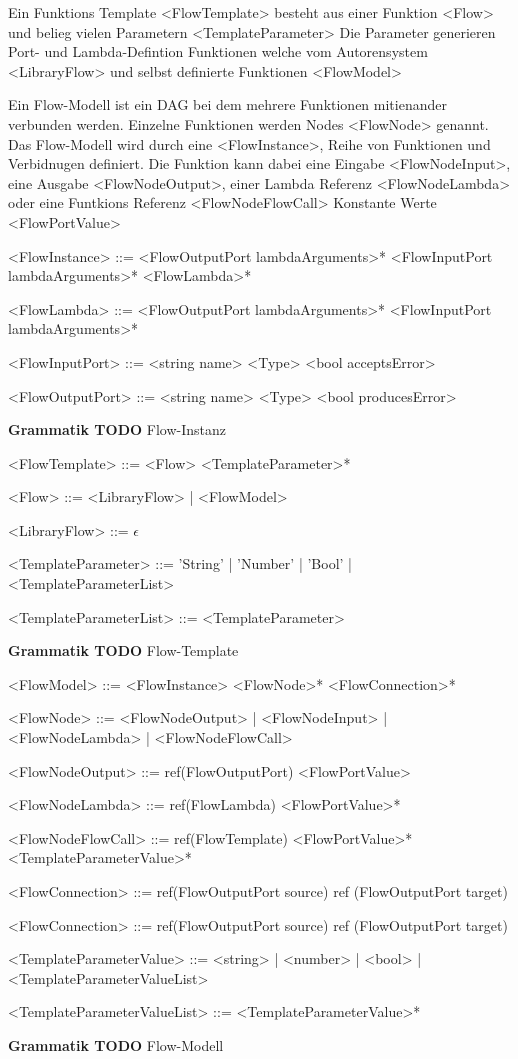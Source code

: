 \documentclass{article}
\begin{document}
    Ein Funktions Template <FlowTemplate> besteht aus einer Funktion <Flow> und belieg vielen Parametern <TemplateParameter>
    Die Parameter generieren Port- und Lambda-Defintion
    Funktionen welche vom Autorensystem <LibraryFlow> und selbst definierte Funktionen <FlowModel>

    Ein Flow-Modell ist ein DAG bei dem mehrere Funktionen mitienander verbunden werden. Einzelne Funktionen werden Nodes <FlowNode> genannt.
    Das Flow-Modell wird durch eine <FlowInstance>, Reihe von Funktionen und Verbidnugen definiert.
    Die Funktion kann dabei eine Eingabe <FlowNodeInput>, eine Ausgabe <FlowNodeOutput>, einer Lambda Referenz <FlowNodeLambda> oder eine Funtkions Referenz <FlowNodeFlowCall>
    Konstante Werte <FlowPortValue>
    \begin{grammar}
        <FlowInstance> ::= <FlowOutputPort lambdaArguments>* <FlowInputPort lambdaArguments>* <FlowLambda>*
        
        <FlowLambda> ::= <FlowOutputPort lambdaArguments>* <FlowInputPort lambdaArguments>*

        <FlowInputPort> ::= <string name> <Type> <bool acceptsError>

        <FlowOutputPort> ::= <string name> <Type> <bool producesError>
    \end{grammar}
    \textbf{Grammatik TODO} Flow-Instanz
    \begin{grammar}
        <FlowTemplate> ::= <Flow> <TemplateParameter>*

        <Flow> ::= <LibraryFlow> | <FlowModel>
        
        <LibraryFlow> ::= $\epsilon$

        <TemplateParameter> ::= 'String' | 'Number' | 'Bool' | <TemplateParameterList>
        
        <TemplateParameterList> ::= <TemplateParameter>
    \end{grammar}
    \textbf{Grammatik TODO} Flow-Template
    \begin{grammar}
        <FlowModel> ::= <FlowInstance> <FlowNode>* <FlowConnection>*

        <FlowNode> ::= <FlowNodeOutput> | <FlowNodeInput> | <FlowNodeLambda> | <FlowNodeFlowCall>
       
        <FlowNodeOutput> ::= ref(FlowOutputPort) <FlowPortValue>

        <FlowNodeLambda> ::= ref(FlowLambda) <FlowPortValue>*

        <FlowNodeFlowCall> ::= ref(FlowTemplate) <FlowPortValue>* <TemplateParameterValue>*
    
        <FlowConnection> ::= ref(FlowOutputPort source) ref (FlowOutputPort target)
    
        <FlowConnection> ::= ref(FlowOutputPort source) ref (FlowOutputPort target)
    
        <TemplateParameterValue> ::= <string> | <number> | <bool> | <TemplateParameterValueList>
    
        <TemplateParameterValueList> ::= <TemplateParameterValue>*
    \end{grammar}
    \textbf{Grammatik TODO} Flow-Modell
    \newpage
\end{document}
